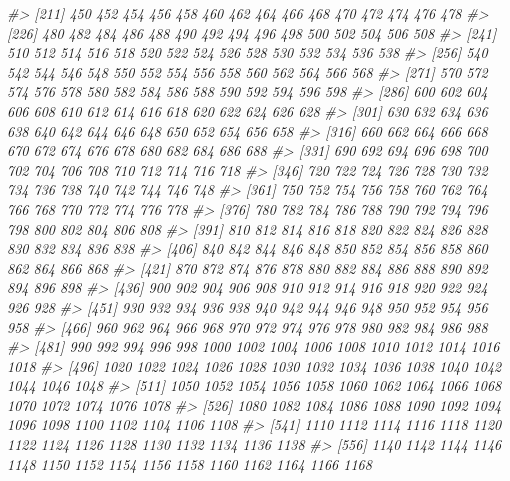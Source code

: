 \documentclass[
]{article}
\newenvironment{Shaded}{\begin{snugshade}}{\end{snugshade}}
\newcommand{\CommentTok}[1]{\textcolor[rgb]{0.56,0.35,0.01}{\textit{#1}}}
\begin{document}
\begin{Shaded}
\begin{Highlighting}[]
\CommentTok{\#\textgreater{} [211]  450  452  454  456  458  460  462  464  466  468  470  472  474  476  478}
\CommentTok{\#\textgreater{} [226]  480  482  484  486  488  490  492  494  496  498  500  502  504  506  508}
\CommentTok{\#\textgreater{} [241]  510  512  514  516  518  520  522  524  526  528  530  532  534  536  538}
\CommentTok{\#\textgreater{} [256]  540  542  544  546  548  550  552  554  556  558  560  562  564  566  568}
\CommentTok{\#\textgreater{} [271]  570  572  574  576  578  580  582  584  586  588  590  592  594  596  598}
\CommentTok{\#\textgreater{} [286]  600  602  604  606  608  610  612  614  616  618  620  622  624  626  628}
\CommentTok{\#\textgreater{} [301]  630  632  634  636  638  640  642  644  646  648  650  652  654  656  658}
\CommentTok{\#\textgreater{} [316]  660  662  664  666  668  670  672  674  676  678  680  682  684  686  688}
\CommentTok{\#\textgreater{} [331]  690  692  694  696  698  700  702  704  706  708  710  712  714  716  718}
\CommentTok{\#\textgreater{} [346]  720  722  724  726  728  730  732  734  736  738  740  742  744  746  748}
\CommentTok{\#\textgreater{} [361]  750  752  754  756  758  760  762  764  766  768  770  772  774  776  778}
\CommentTok{\#\textgreater{} [376]  780  782  784  786  788  790  792  794  796  798  800  802  804  806  808}
\CommentTok{\#\textgreater{} [391]  810  812  814  816  818  820  822  824  826  828  830  832  834  836  838}
\CommentTok{\#\textgreater{} [406]  840  842  844  846  848  850  852  854  856  858  860  862  864  866  868}
\CommentTok{\#\textgreater{} [421]  870  872  874  876  878  880  882  884  886  888  890  892  894  896  898}
\CommentTok{\#\textgreater{} [436]  900  902  904  906  908  910  912  914  916  918  920  922  924  926  928}
\CommentTok{\#\textgreater{} [451]  930  932  934  936  938  940  942  944  946  948  950  952  954  956  958}
\CommentTok{\#\textgreater{} [466]  960  962  964  966  968  970  972  974  976  978  980  982  984  986  988}
\CommentTok{\#\textgreater{} [481]  990  992  994  996  998 1000 1002 1004 1006 1008 1010 1012 1014 1016 1018}
\CommentTok{\#\textgreater{} [496] 1020 1022 1024 1026 1028 1030 1032 1034 1036 1038 1040 1042 1044 1046 1048}
\CommentTok{\#\textgreater{} [511] 1050 1052 1054 1056 1058 1060 1062 1064 1066 1068 1070 1072 1074 1076 1078}
\CommentTok{\#\textgreater{} [526] 1080 1082 1084 1086 1088 1090 1092 1094 1096 1098 1100 1102 1104 1106 1108}
\CommentTok{\#\textgreater{} [541] 1110 1112 1114 1116 1118 1120 1122 1124 1126 1128 1130 1132 1134 1136 1138}
\CommentTok{\#\textgreater{} [556] 1140 1142 1144 1146 1148 1150 1152 1154 1156 1158 1160 1162 1164 1166 1168}

\end{Highlighting}
\end{Shaded}
\end{document}
